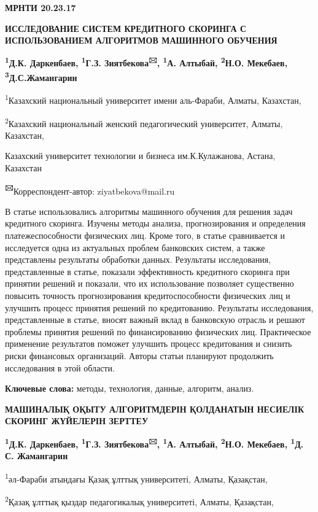 \newpage
{\bfseries МРНТИ 20.23.17}

{\bfseries ИССЛЕДОВАНИЕ СИСТЕМ КРЕДИТНОГО СКОРИНГА С ИСПОЛЬЗОВАНИЕМ
АЛГОРИТМОВ МАШИННОГО ОБУЧЕНИЯ}

{\bfseries \textsuperscript{1}Д.К. Даркенбаев, \textsuperscript{1}Г.З.
Зиятбекова\textsuperscript{🖂}, \textsuperscript{1}А. Алтыбай,
\textsuperscript{2}Н.О. Мекебаев, \textsuperscript{3}Д.С.Жамангарин}

\textsuperscript{1}Казахский национальный университет имени аль-Фараби,
Алматы, Казахстан,

\textsuperscript{2}Казахский национальный женский педагогический
университет, Алматы, Казахстан,

Казахский университет технологии и бизнеса им.К.Кулажанова, Астана,
Казахстан

{\bfseries \textsuperscript{🖂}}Корреспондент-автор: ziyatbekova@mail.ru

В статье использовались алгоритмы машинного обучения для решения задач
кредитного скоринга. Изучены методы анализа, прогнозирования и
определения платежеспособности физических лиц. Кроме того, в статье
сравнивается и исследуется одна из актуальных проблем банковских систем,
а также представлены результаты обработки данных. Результаты
исследования, представленные в статье, показали эффективность кредитного
скоринга при принятии решений и показали, что их использование позволяет
существенно повысить точность прогнозирования кредитоспособности
физических лиц и улучшить процесс принятия решений по кредитованию.
Результаты исследования, представленные в статье, вносят важный вклад в
банковскую отрасль и решают проблемы принятия решений по финансированию
физических лиц. Практическое применение результатов поможет улучшить
процесс кредитования и снизить риски финансовых организаций. Авторы
статьи планируют продолжить исследования в этой области.

{\bfseries Ключевые слова:} методы, технология, данные, алгоритм, анализ.

{\bfseries МАШИНАЛЫҚ ОҚЫТУ АЛГОРИТМДЕРІН ҚОЛДАНАТЫН НЕСИЕЛІК СКОРИНГ
ЖҮЙЕЛЕРІН ЗЕРТТЕУ}

{\bfseries \textsuperscript{1}Д.К. Даркенбаев, \textsuperscript{1}Г.З.
Зиятбекова\textsuperscript{🖂}, \textsuperscript{1}А. Алтыбай,
\textsuperscript{2}Н.О. Мекебаев, \textsuperscript{1}Д. С. Жамангарин}

\textsuperscript{1}әл-Фараби атындағы Қазақ ұлттық университеті, Алматы,
Қазақстан,

\textsuperscript{2}Қазақ ұлттық қыздар педагогикалық университеті,
Алматы, Қазақстан,

